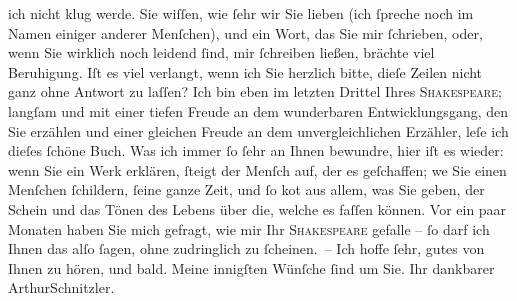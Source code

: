 \begin{ledgroupsized}[t]{13cm}
               ich nicht klug werde. Sie wiſſen, wie ſehr wir Sie lieben (ich ſpreche noch im Namen
               einiger anderer Menſchen), und ein Wort, das Sie mir ſchrieben, oder, wenn Sie
               wirklich noch lei{\pb}dend ſind, mir ſchreiben ließen,
               brächte viel Beruhigung. Iſt es viel verlangt, wenn ich Sie herzlich bitte, dieſe
               Zeilen nicht ganz ohne Antwort zu laſſen?\pend
           \pstart
           Ich \introOben{}bin\introOben{} eben im letzten Drittel Ihres \textsc{Shakespeare}; langſam und mit einer tiefen Freude an dem wunderbaren {\pb}Entwicklungsgang, den Sie erzählen und einer
               gleichen Freude an dem unvergleichlichen Erzähler, leſe ich dieſes ſchöne Buch. Was
               ich immer ſo ſehr an Ihnen bewundre, hier iſt es wieder: wenn Sie ein Werk erklären,
               ſteigt der Menſch auf, der es geſchaffen; we{\geminationn} Sie einen
               Menſchen ſchildern, ſeine ganze Zeit, und {\pb}ſo ko{\geminationm}t aus allem, was
               Sie geben, der Schein und das Tönen des Lebens über die, welche es faſſen können. Vor
               ein paar Monaten haben Sie mich gefragt, wie mir Ihr \textsc{Shakespeare} gefalle – ſo darf ich Ihnen das alſo ſagen, ohne zudringlich zu ſcheinen. –\pend
           \pstart Ich hoffe ſehr, gutes von Ihnen zu hören, und bald. Meine innigſten Wünſche ſind
               um Sie. Ihr dankbarer \spacefill\mbox{ArthurSchnitzler.}\pend{}
         
         \endnumbering{}\end{ledgroupsized}  \newcommand{\dateiname}{L00696}\newcommand{\titel}{Arthur Schnitzler an Georg Brandes, 9. 7. 1897}\newcommand{\editorInnen}{Martin Anton Müller und Gerd-Hermann Susen}
      